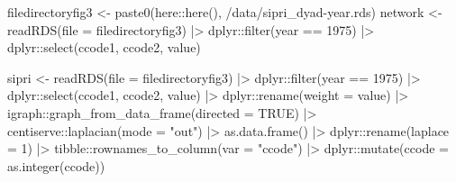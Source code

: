 \documentclass[
  12,
  letterpaper,
  DIV=11,
  numbers=noendperiod]{scrartcl}
\newenvironment{Shaded}{\begin{snugshade}}{\end{snugshade}}
\newcommand{\AttributeTok}[1]{\textcolor[rgb]{0.40,0.45,0.13}{#1}}
\newcommand{\ConstantTok}[1]{\textcolor[rgb]{0.56,0.35,0.01}{#1}}
\newcommand{\DecValTok}[1]{\textcolor[rgb]{0.68,0.00,0.00}{#1}}
\newcommand{\FunctionTok}[1]{\textcolor[rgb]{0.28,0.35,0.67}{#1}}
\newcommand{\NormalTok}[1]{\textcolor[rgb]{0.00,0.23,0.31}{#1}}
\newcommand{\OtherTok}[1]{\textcolor[rgb]{0.00,0.23,0.31}{#1}}
\newcommand{\SpecialCharTok}[1]{\textcolor[rgb]{0.37,0.37,0.37}{#1}}
\newcommand{\StringTok}[1]{\textcolor[rgb]{0.13,0.47,0.30}{#1}}
\begin{document}
\begin{Shaded}
\begin{Highlighting}[numbers=left,,]
\NormalTok{filedirectoryfig3 }\OtherTok{\textless{}{-}} \FunctionTok{paste0}\NormalTok{(here}\SpecialCharTok{::}\FunctionTok{here}\NormalTok{(), }\StringTok{\textquotesingle{}/data/sipri\_dyad{-}year.rds\textquotesingle{}}\NormalTok{)}
\NormalTok{network }\OtherTok{\textless{}{-}} \FunctionTok{readRDS}\NormalTok{(}\AttributeTok{file =}\NormalTok{ filedirectoryfig3) }\SpecialCharTok{|\textgreater{}}
\NormalTok{  dplyr}\SpecialCharTok{::}\FunctionTok{filter}\NormalTok{(year }\SpecialCharTok{==} \DecValTok{1975}\NormalTok{) }\SpecialCharTok{|\textgreater{}}
\NormalTok{  dplyr}\SpecialCharTok{::}\FunctionTok{select}\NormalTok{(ccode1, ccode2, value)}

\NormalTok{sipri }\OtherTok{\textless{}{-}} \FunctionTok{readRDS}\NormalTok{(}\AttributeTok{file =}\NormalTok{ filedirectoryfig3) }\SpecialCharTok{|\textgreater{}}
\NormalTok{  dplyr}\SpecialCharTok{::}\FunctionTok{filter}\NormalTok{(year }\SpecialCharTok{==} \DecValTok{1975}\NormalTok{) }\SpecialCharTok{|\textgreater{}}
\NormalTok{  dplyr}\SpecialCharTok{::}\FunctionTok{select}\NormalTok{(ccode1, ccode2, value) }\SpecialCharTok{|\textgreater{}}
\NormalTok{  dplyr}\SpecialCharTok{::}\FunctionTok{rename}\NormalTok{(}\AttributeTok{weight =}\NormalTok{ value) }\SpecialCharTok{|\textgreater{}}
\NormalTok{  igraph}\SpecialCharTok{::}\FunctionTok{graph\_from\_data\_frame}\NormalTok{(}\AttributeTok{directed =} \ConstantTok{TRUE}\NormalTok{) }\SpecialCharTok{|\textgreater{}}
\NormalTok{  centiserve}\SpecialCharTok{::}\FunctionTok{laplacian}\NormalTok{(}\AttributeTok{mode =} \StringTok{"out"}\NormalTok{) }\SpecialCharTok{|\textgreater{}}
  \FunctionTok{as.data.frame}\NormalTok{() }\SpecialCharTok{|\textgreater{}}
\NormalTok{  dplyr}\SpecialCharTok{::}\FunctionTok{rename}\NormalTok{(}\AttributeTok{laplace =} \DecValTok{1}\NormalTok{) }\SpecialCharTok{|\textgreater{}}
\NormalTok{  tibble}\SpecialCharTok{::}\FunctionTok{rownames\_to\_column}\NormalTok{(}\AttributeTok{var =} \StringTok{"ccode"}\NormalTok{) }\SpecialCharTok{|\textgreater{}}
\NormalTok{  dplyr}\SpecialCharTok{::}\FunctionTok{mutate}\NormalTok{(}\AttributeTok{ccode =} \FunctionTok{as.integer}\NormalTok{(ccode))}


\end{Highlighting}
\end{Shaded}
\end{document}
